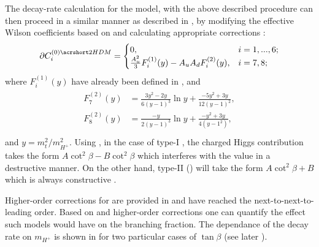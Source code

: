 The decay-rate calculation for the \TwoHDM model, with the above described procedure can then proceed in a similar manner as described in , by modifying the effective Wilson coefficients based on  and calculating appropriate corrections \cite{Ciuchini:1997xe}:
\begin{equation}\label{eq:partial_wilson_2hdm}
    \partial C_i^{(0)\TwoHDM} = 
    \begin{cases}
        0, & i=1,...,6;\\
        \frac{A_u^2}{3}F_i^{(1)}(y) - A_uA_dF_i^{(2)}(y), & i=7,8;\\
    \end{cases}
\end{equation}
where $F_i^{(1)}(y)$ have already been defined in , and
\begin{align}
    \begin{split}
    F_7^{(2)}(y) &= \frac{3y^2-2y}{6(y-1)^3}\ln y + \frac{-5y^2+3y}{12(y-1)^2},\\
    F_8^{(2)}(y) &= \frac{-y}{2(y-1)^3}\ln y + \frac{-y^2+3y}{4(y-1^2)},\\
    \end{split}
\end{align}
and $y = m_t^2/m_{H^+}^2$.
Using , in the case of type-I \TwoHDM, the charged Higgs contribution takes the form $A\cot^2\beta-B\cot^2\beta$ which interferes with the \SM value in a destructive manner.
On the other hand, type-II \TwoHDM () will take the form $A\cot^2\beta+B$ which is always constructive \cite{Misiak:2017bgg}.

Higher-order corrections for \TwoHDM are provided in \cite{Ciuchini:1997xe,Hermann:2012fc} and have reached the next-to-next-to-leading order.
Based on  and higher-order corrections one can quantify the effect such models would have on the \BtoXsgamma branching fraction.
The dependance of the \BtoXsgamma decay rate on $m_{H^+}$ is shown in  for two particular cases of $\tan\beta$ (see later ).

